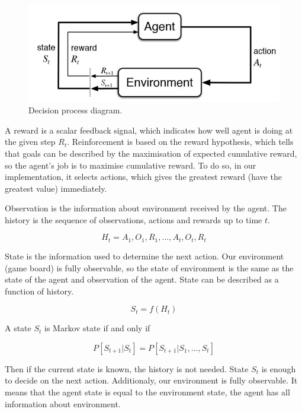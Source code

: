 \documentclass[a4paper,12pt]{book}
\begin{document}
\begin{figure}[!h]
	\includegraphics{./Images/RLdiag.jpg}
	\centering
	\caption{Decision process diagram\protect\footnotemark.}
	\label{fig:Capture1}
\end{figure}

A reward is a scalar feedback signal, which indicates how well agent is doing at the given step $R_{t}$. Reinforcement is based on the reward hypothesis, which tells that goals can be described by the maximisation of expected cumulative reward, so the agent's job is to maximise cumulative reward. To do so, in our implementation, it selects actions, which gives the greatest reward (have the greatest value) immediately. 

Observation is the information about environment received by the agent. The history is the sequence of observations, actions and rewards up to time $t$.

\begin{equation}
	H_{t} = A_{1}, O_{1}, R_{1}, ...,  A_{t}, O_{t}, R_{t}
\end{equation}

State is the information used to determine the next action. Our environment (game board) is fully observable, so the state of environment is the same as the state of the agent and observation of the agent. State can be described as a function of history.

\begin{equation}
	S_{t} = f(H_{t})
\end{equation}

A state $S_{t}$ is Markov state if and only if

\begin{equation}
	P[S_{t+1} | S_{t}] = P[S_{t+1} | S_{1}, ..., S_{t}]
\end{equation}

Then if the current state is known, the history is not needed. State $S_{t}$ is enough to decide on the next action.
Additionaly, our environment is fully observable. It means that the agent state is equal to the environment state, the agent has all information about environment.
\end{document}
